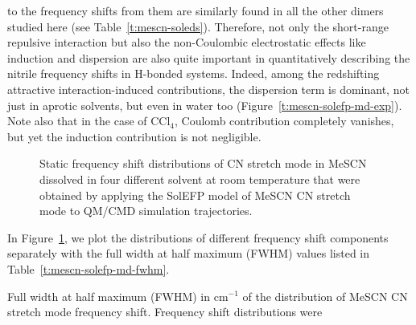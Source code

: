 \documentclass[a4paper,titlepage,twoside,fleqn,12pt]{book}
\begin{document}
\begin{refsection}
to the frequency shifts from them are similarly found in all the
other dimers studied here (see Table~\ref{t:mescn-soleds}). Therefore, not only
the short\hyp{}range repulsive interaction but also the 
non\hyp{}Coulombic electrostatic effects like induction and dispersion
are also quite important in quantitatively describing the nitrile
frequency shifts in H-bonded systems. Indeed, among the redshifting
attractive interaction\hyp{}induced contributions, the
dispersion term is dominant, not just in aprotic solvents, but
even in water too (Figure~\ref{t:mescn-solefp-md-exp}). Note also that in the case of CCl$_4$,
Coulomb contribution completely vanishes, but yet the
induction contribution is not negligible.

%
\begin{figure}[t!]
\centering
\setlength\fboxsep{0.4pt}
\setlength\fboxrule{0.5pt}
\caption{
Static frequency shift distributions of CN stretch mode in MeSCN dissolved in four different solvent at room
temperature that were obtained by applying the SolEFP model of MeSCN CN stretch mode to QM/CMD simulation
trajectories.
\label{f:mescn-solefp-md-distr}}
\end{figure}
%
In Figure~\ref{f:mescn-solefp-md-distr}, 
we plot the distributions of different frequency
shift components separately with the full width at half
maximum (FWHM) values listed in Table~\ref{t:mescn-solefp-md-fwhm}. 
%
\begin{table}[t!]
\caption{
Full width at half maximum (FWHM) in cm$^{-1}$ of the distribution of
MeSCN CN stretch mode frequency shift. Frequency shift distributions were
}
\end{table}
\end{refsection}
\end{document}
